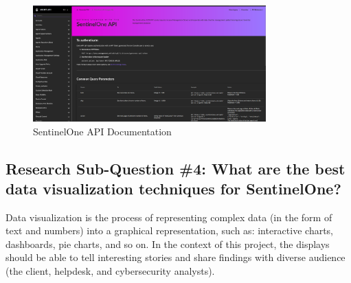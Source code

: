\begin{figure}[htbp]
      \centering
      \includegraphics[width=0.8\textwidth]{Figures/SentinelOne/API Doc.png}
      \caption{SentinelOne API Documentation}
\end{figure}

\begin{multicols}{2}
      \section{Research Sub-Question \#4: What are the best data visualization techniques for SentinelOne?}
      Data visualization is the process of representing complex data (in the form of text and numbers) into a
      graphical representation, such as: interactive charts, dashboards, pie charts, and so on. In the context
      of this project, the displays should be able to tell interesting stories and share findings with diverse
      audience (the client, helpdesk, and cybersecurity analysts).


\end{multicols}

